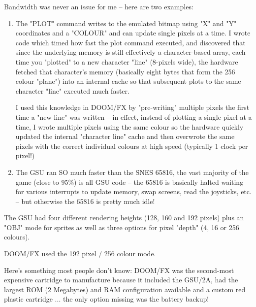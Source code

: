 {\par
 Bandwidth was never an issue for me -- here are two examples:
\begin{enumerate}
\item       The "PLOT" command writes to the emulated bitmap using "X" and "Y" coordinates and a "COLOUR" and can update single pixels at a time.  I wrote code which timed how fast the plot command executed, and discovered that since the underlying memory is still effectively a character-based array, each time you "plotted" to a new character "line" (8-pixels wide), the hardware fetched that character's memory (basically eight bytes that form the 256 colour "plane") into an internal cache so that subsequent plots to the same character "line" executed much faster.


I used this knowledge in DOOM/FX by "pre-writing" multiple pixels the first time a "new line" was written -- in effect, instead of plotting a single pixel at a time, I wrote multiple pixels using the same colour so the hardware quickly updated the internal "character line" cache and then overwrote the same pixels with the correct individual colours at high speed (typically 1 clock per pixel!)

 

\item       The GSU ran SO much faster than the SNES 65816, the vast majority of the game (close to 95\%) is all GSU code -- the 65816 is basically halted waiting for various interrupts to update memory, swap screens, read the joysticks, etc. -- but otherwise the 65816 is pretty much idle!
\end{enumerate}
 

The GSU had four different rendering heights (128, 160 and 192 pixels) plus an "OBJ" mode for sprites as well as three options for pixel "depth" (4, 16 or 256 colours).\\
\par
 DOOM/FX used the 192 pixel / 256 colour mode.\\
\par
 Here's something most people don't know: DOOM/FX was the second-most expensive cartridge to manufacture because it included the GSU/2A, had the largest ROM (2 Megabytes) and RAM configuration available and a custom red plastic cartridge ... the only option missing was the battery backup!}















